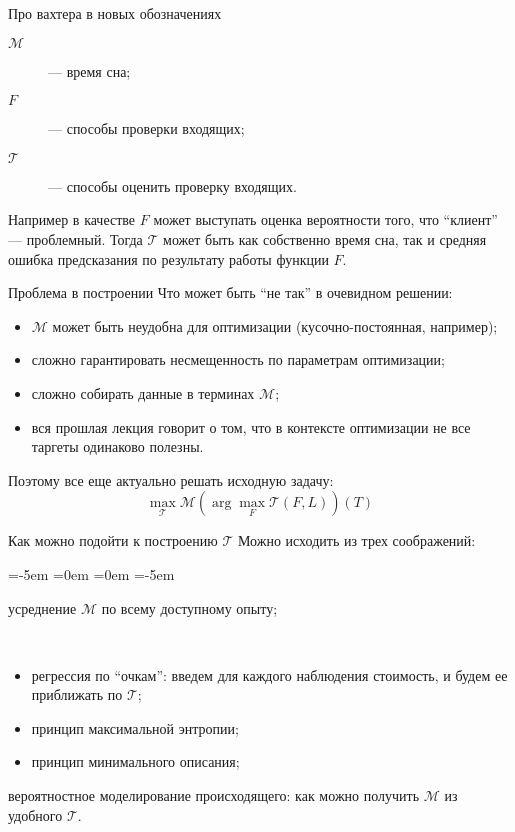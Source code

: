 \documentclass[14pt, fleqn, xcolor={dvipsnames, table}]{beamer}
\begin{document}
\begin{frame}{Про вахтера в новых обозначениях}
\begin{description}
  \item[$\mathcal{M}$] --- время сна;
  \item[$F$] --- способы проверки входящих;
  \item[$\mathcal{T}$] --- способы оценить проверку входящих.
\end{description}
Например в качестве $F$ может выступать оценка вероятности того, что ``клиент'' --- проблемный. Тогда $\mathcal{T}$ может быть как собственно время сна, так и средняя ошибка предсказания по результату работы функции $F$.
\end{frame}

\begin{frame}{Проблема в построении}
Что может быть ``не так'' в очевидном решении:
\begin{itemize}
  \item $\mathcal{M}$ может быть неудобна для оптимизации (кусочно-постоянная, например);
  \item сложно гарантировать несмещенность по параметрам оптимизации;
  \item сложно собирать данные в терминах $\mathcal{M}$;
  \item вся прошлая лекция говорит о том, что в контексте оптимизации не все таргеты одинаково полезны.
\end{itemize} 
Поэтому все еще актуально решать исходную задачу:
$$
\max_{\mathcal{T}} \mathcal{M} \left(\arg\max_{F} \mathcal{T}(F, L)\right)(T)
$$
\end{frame}

\begin{frame}{Как можно подойти к построению $\mathcal{T}$}
Можно исходить из трех соображений:
\begin{description}
\small
\leftmargin=-5em
\itemindent=0em
=0em
\leftskip=-5em
  \item[$\mathcal{T} \equiv \mathcal{M}$:] усреднение $\mathcal{M}$ по всему доступному опыту;
  \item[$\arg\max_{F} \mathcal{T}(F, L) = \arg\max_{F} \mathcal{M}(F, L)$:]~\\
  \begin{itemize}
  \itemindent=0em
  \leftskip=-4em
    \item регрессия по ``очкам'': введем для каждого наблюдения стоимость, и будем ее приближать по $\mathcal{T}$;
    \item принцип максимальной энтропии;
    \item принцип минимального описания;
  \end{itemize}
  \item[$\max_{\mathcal{T}} \mathcal{M} \left(\arg\max_{F} \mathcal{T}(F, L)\right)(T)$:] вероятностное моделирование происходящего: как можно получить $\mathcal{M}$ из удобного $\mathcal{T}$.
\end{description} 
\end{frame}
\end{document}
